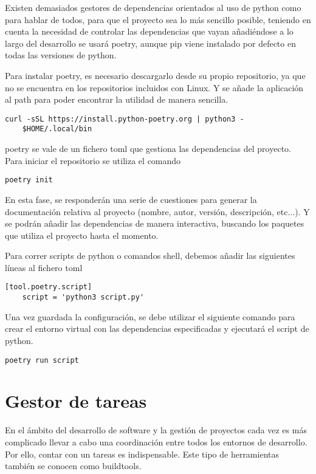 Existen demasiados gestores de \glspl{dependencia} orientados al uso de \Gls{python} como para hablar de todos, para que el proyecto sea lo más sencillo posible, teniendo en cuenta la necesidad de controlar las \glspl{dependencia} que vayan añadiéndose a lo largo del desarrollo se usará \Gls{poetry}, aunque \Gls{pip} viene instalado por defecto en todas las versiones de \Gls{python}. 

Para instalar \gls{poetry}, es necesario descargarlo desde su propio repositorio, ya que no se encuentra en los repositorios incluidos con Linux. Y se añade la aplicación al \gls{path} para poder encontrar la utilidad de manera sencilla.
\begin{lstlisting}[style=consola]
	curl -sSL https://install.python-poetry.org | python3 -
	$HOME/.local/bin
\end{lstlisting}

\gls{poetry} se vale de un fichero \gls{toml} que gestiona las \glspl{dependencia} del proyecto. Para iniciar el \gls{repositorio} se utiliza el comando
\begin{lstlisting}[style=consola]
	poetry init
\end{lstlisting}

En esta fase, se responderán una serie de cuestiones para generar la documentación relativa al proyecto (nombre, autor, versión, descripción, etc...). Y se podrán añadir las \glspl{dependencia} de manera interactiva, buscando los paquetes que utiliza el proyecto hasta el momento.

Para correr \glspl{script} de \gls{python} o comandos \gls{shell}, debemos añadir las siguientes líneas al fichero \gls{toml}
\begin{lstlisting}[style=consola]
	[tool.poetry.script]
	script = 'python3 script.py'
\end{lstlisting}

Una vez guardada la configuración, se debe utilizar el siguiente comando para crear el entorno virtual con las \glspl{dependencia} especificadas y ejecutará el \gls{script} de \gls{python}. 
\begin{lstlisting}[style=consola]
	poetry run script
\end{lstlisting}

\section{Gestor de tareas}
En el ámbito del desarrollo de software y la gestión de proyectos cada vez es más complicado llevar a cabo una coordinación entre todos los entornos de desarrollo. Por ello, contar con un \gls{tareas} es indispensable. Este tipo de herramientas también se conocen como \gls{buildtools}. 


